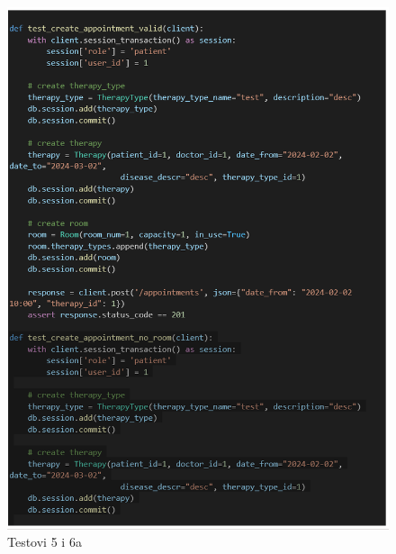 			\begin{figure}[H]
				\includegraphics[scale=0.3]{slike/testovi_5_6dio.PNG} %
				\centering
				\caption{Testovi 5 i 6a}
				\label{fig:testovi56a}
			\end{figure}
			
